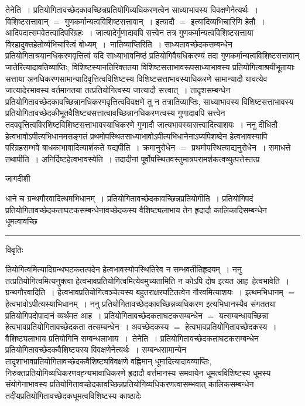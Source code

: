 \documentclass[10pt, openany]{book}
\begin{document}
{{\la तेनेति~।} प्रतियोगितावच्छेदकावच्छिन्नप्रतियोगिव्यधिकरणत्वेन साध्याभावस्य विवक्षणेनेत्यर्थः~। विशिष्टसत्तावान् $=$ गुणकर्मान्यत्वविशिष्टसत्तावान्~। इत्यादौ $=$ 
इत्यादिव्यभिचारिणि हेतौ~। आदिपदात्समवेतत्वादिपरिग्रहः~। जात्यादेर्गुणादावपि सत्त्वेन तत्र गुणकर्मान्यत्वविशिष्टसत्ताया विरहादुक्तहेतोर्व्यभिचारित्वं बोध्यम्~।~{\la नातिव्याप्तिरिति~।} साध्यतावच्छेदकसम्बन्धेन प्रतियोगिताश्रयानधिकरणवृत्तित्वं यदि साध्याभावनिष्ठं प्रतियोगिवैयधिकरण्यं तदा गुणकर्मान्यत्वविशिष्टसत्तावान् जातेरित्यादावतिव्याप्तिः, विशिष्टस्यानतिरिक्ततया विशिष्टसत्ताभावरूपसाध्याभावस्य प्रतियोगित्वाश्रयीभूतायाः सत्ताया अनधिकरणसामान्यादिवृत्तित्वविशिष्टस्य विशिष्टसत्ताभावस्याधिकरणे सामान्यादौ यावत्येव जात्यादेरभावस्य वर्तमानतया तत्प्रतियोगित्वस्य जात्यादौ सत्त्वात्~। तादृशसम्बन्धेन प्रतियोगितावच्छेदकावच्छिन्नानधिकरणवृत्तित्वविवक्षणे तु न तत्रातिव्याप्तिः, साध्याभावस्य विशिष्टसत्ताभावस्य प्रतियोगितावच्छेदकीभूतवैशिष्ट्यसत्तात्वावच्छिन्नानधिकरणत्वस्य गुणादावपि सत्त्वेन तदववृत्तित्वविरशिष्टविशिष्टसत्ताभावस्याधिकरणे गुणादौ जात्यभावस्यासत्त्वादित्याशयः~। ननु दीधितौ हेत्वभावोऽपीत्यभिधानमसङ्गतं प्रथमोपस्थितसाध्याभावोऽपीत्यभिधानेनाऽप्यपिशब्देन हेत्वभावस्यापि परिग्रहसम्भवे बाधकाभावादित्याशंकते {\la यद्यपीति~।}
क्रमानुरोधेन $=$ प्रथमोपस्थित्याद्यनुरोधेन~। समाधत्ते {\la तथापीति~। अनिर्दिष्टहेत्वभावस्येति~।} तदादीनां पूर्वोपस्थितवस्तुमात्रपरामर्शकत्वव्युत्पत्तेस्तत्प्र
\newpage
\lfoot{}
\begin{center} जागदीशी \end{center}
{\la धाने च ग्रन्थगौरवादित्थमभिधानम्~। प्रतियोगितावच्छेदकावच्छिन्नप्रतियोगीति~। प्रतियोगिपदं प्रतियोगितावच्छेदकताघटकसम्बन्धेनावच्छेदकस्य वैशिष्ट्यलाभाय तेन हृदादौ कालिकादिसम्बन्धेन धूमत्वावच्छि}\\
\hrule
\begin{center}     विवृतिः \end{center}
तियोगित्वमित्यादिग्रन्थघटकतत्पदेन हेत्वभावस्योपस्थितिरेव न सम्भवतीतिहृदयम्~। ननु तत्प्रतियोगित्वमित्यनुक्त्वा हेत्वभावप्रतियोगित्वमित्येवमुच्यतामिति न कोऽपि दोष इत्यत आह\textendash\ {\la हेत्वभावेति~।} ग्रन्थगौरवादिति~। हेत्वभावप्रतियोगित्वञ्चेत्यस्य बहुतराक्षरघटितत्वेन गौरवमित्याशयः~। इत्थमभिधानम् $=$ हेत्वभावोऽपीत्यस्याभिधानम्~। ननु प्रतियोगितावच्छेदकावच्छिन्नव्यधिकरण इत्यभिधानस्यैव संगततया प्रतियोगिपदोपादानं व्यर्थमत आह~। प्रतियोगितावच्छेदकताघटकसम्बन्धेन $=$ यत्सम्बन्धावच्छिन्ना हेत्वभावप्रतियोगितावच्छेदकता तत्सम्बन्धेन~। अवच्छेदकस्य $=$ हेत्वभावप्रतियोगितावच्छेदकस्य~। वैशिष्ट्यलाभाय {\la प्रतियोगिनि सम्बन्धलाभाय}~।~{\la तेनेति~।}
प्रतियोगितावच्छेदकताघटकसम्बन्धेन प्रतियोगितावच्छेदकवैशिष्ट्यस्य विवक्षणेनेत्यर्थः~। सम्बन्धसामान्येन तादृशाभावप्रतियोगितावच्छेदकवैशिष्ट्यविवक्षणे वह्निमान् धूमादित्यादावव्याप्तिः, निरुक्तप्रतियोगिव्यधिकरणवह्न्यभावाधिकरणे ह्रदादौ वर्त्तमानस्य समवायेन धूमत्वविशिष्टस्य धूमस्य संयोगेनाभावस्य प्रतियोगितावच्छेदकावच्छिन्नप्रतियोगिव्यधिकरणत्वासम्भवात् कालिकसम्बन्धेन तदीयप्रतियोगितावच्छेदकधूमत्वविशिष्टस्य काष्ठादेः
}
\end{document}
